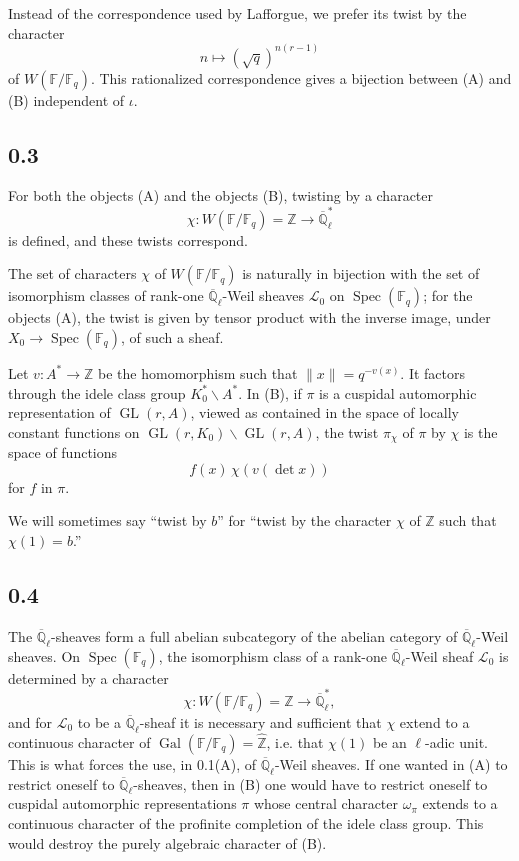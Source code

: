 \documentclass[10pt]{article}
\newcommand{\F}{\mathbb{F}}
\newcommand{\Z}{\mathbb{Z}}
\newcommand{\Ql}{\overline{\mathbb Q}_{\ell}}
\newcommand{\Spec}{\operatorname{Spec}}
\newcommand{\Gal}{\operatorname{Gal}}
\newcommand{\GL}{\operatorname{GL}}
\begin{document}
Instead of the correspondence used by Lafforgue, we prefer its twist by the character
\[
 n\longmapsto (\sqrt q)^{n(r-1)}
\]
of $W(\F/\F_q)$.
This rationalized correspondence gives a bijection between (A) and (B) independent of $\iota$.

\subsection*{0.3}
For both the objects (A) and the objects (B), twisting by a character
\[
 \chi:W(\F/\F_q)=\Z\longrightarrow \Ql^*
\]
is defined, and these twists correspond.

The set of characters $\chi$ of $W(\F/\F_q)$ is naturally in bijection with the set of isomorphism classes of rank-one $\Ql$-Weil sheaves $\mathcal L_0$ on $\Spec(\F_q)$; for the objects (A), the twist is given by tensor product with the inverse image, under $X_0\to\Spec(\F_q)$, of such a sheaf.

Let $v:A^*\to\Z$ be the homomorphism such that $\|x\|=q^{-v(x)}$.
It factors through the idele class group $K_0^*\backslash A^*$.
In (B), if $\pi$ is a cuspidal automorphic representation of $\GL(r,A)$, viewed as contained in the space of locally constant functions on $\GL(r,K_0)\backslash\GL(r,A)$, the twist $\pi_\chi$ of $\pi$ by $\chi$ is the space of functions
\[
 f(x)\,\chi(v(\det x))
\]
for $f$ in $\pi$.

We will sometimes say ``twist by $b$'' for ``twist by the character $\chi$ of $\Z$ such that $\chi(1)=b$.''

\subsection*{0.4}
The $\Ql$-sheaves form a full abelian subcategory of the abelian category of $\Ql$-Weil sheaves.
On $\Spec(\F_q)$, the isomorphism class of a rank-one $\Ql$-Weil sheaf $\mathcal L_0$ is determined by a character
\[
 \chi:W(\F/\F_q)=\Z\longrightarrow \Ql^* ,
\]
and for $\mathcal L_0$ to be a $\Ql$-sheaf it is necessary and sufficient that $\chi$ extend to a continuous character of $\Gal(\F/\F_q)=\widehat{\Z}$, i.e. that $\chi(1)$ be an $\ell$-adic unit.
This is what forces the use, in 0.1(A), of $\Ql$-Weil sheaves.
If one wanted in (A) to restrict oneself to $\Ql$-sheaves, then in (B) one would have to restrict oneself to cuspidal automorphic representations $\pi$ whose central character $\omega_\pi$ extends to a continuous character of the profinite completion of the idele class group.
This would destroy the purely algebraic character of (B).
\end{document}
